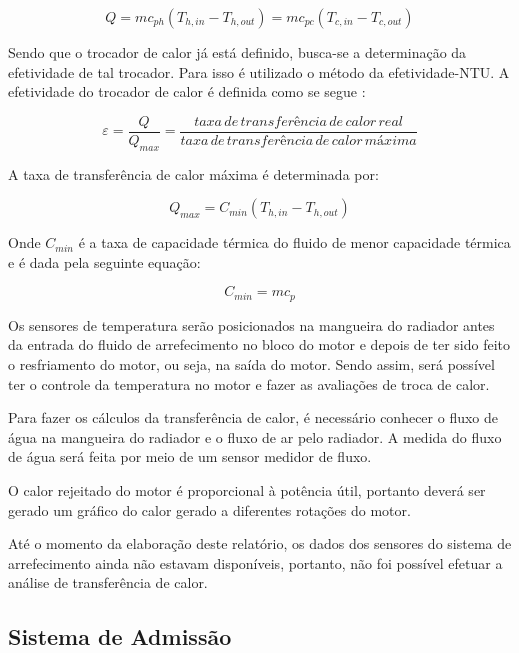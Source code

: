 \begin{equation}
	Q = mc_{ph}(T_{h, in} - T_{h, out}) = mc_{pc}(T_{c, in} - T_{c, out})
\end{equation}

Sendo que o trocador de calor já está definido, busca-se a determinação da efetividade de tal trocador. Para isso é utilizado o método da efetividade-NTU. A efetividade do trocador de calor é definida como se segue \cite{energiaTransferencia}:

\begin{equation}
	\varepsilon = \frac{Q}{Q_{max}} = \frac{taxa\,de\,transferência\,de\,calor\,real}{taxa\,de\,transferência\,de\,calor\,máxima}
\end{equation}

A taxa de transferência de calor máxima é determinada por:

\begin{equation}
	Q_{max} = C_{min} (T_{h, in} - T_{h, out})
\end{equation}

Onde $C_{min}$ é a taxa de capacidade térmica do fluido de menor capacidade térmica e é dada pela seguinte equação:

\begin{equation}
	C_{min} = mc_{p}
\end{equation}

Os sensores de temperatura serão posicionados na mangueira do radiador antes da entrada do fluido de arrefecimento no bloco do motor e depois de ter sido feito o resfriamento do motor, ou seja, na saída do motor. Sendo assim, será possível ter o controle da temperatura no motor e fazer as avaliações de troca de calor.

Para fazer os cálculos da transferência de calor, é necessário conhecer o fluxo de água na mangueira do radiador e o fluxo de ar pelo radiador. A medida do fluxo de água será feita por meio de um sensor medidor de fluxo.

O calor rejeitado do motor é proporcional à potência útil, portanto deverá ser gerado um gráfico do calor gerado a diferentes rotações do motor.

Até o momento da elaboração deste relatório, os dados dos sensores do sistema de arrefecimento ainda não estavam disponíveis, portanto, não foi possível efetuar a análise de transferência de calor.

\subsection{Sistema de Admissão}

